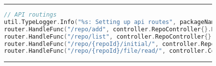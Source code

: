 \begin{figure}[h]
\noindent\rule{\textwidth}{1pt}
\begin{lstlisting}[language=go, caption={Api routes}, label={lst:apiRouting}]
// API routings
util.TypeLogger.Info("%s: Setting up api routes", packageName)
router.HandleFunc("/repo/add", controller.RepoController{}.NewRepoFromURI)
router.HandleFunc("/repo/list", controller.RepoController{}.GetAllRepos)
router.HandleFunc("/repo/{repoId}/initial/", controller.RepoController{}.ParseInitial)
router.HandleFunc("/repo/{repoId}/file/read/", controller.CodeSnippetController{}.GetImplementation)
\end{lstlisting}
\noindent\rule{\textwidth}{1pt}
\end{figure}